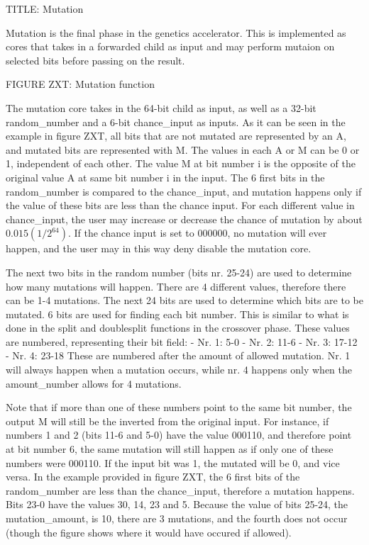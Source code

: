 TITLE: Mutation

Mutation is the final phase in the genetics accelerator. This is implemented as cores that takes in a forwarded child as input and may perform mutaion on selected bits before passing on the result. 

FIGURE ZXT: Mutation function

The mutation core takes in the 64-bit child as input, as well as a 32-bit random\_number and a 6-bit chance\_input as inputs. As it can be seen in the example in figure ZXT, all bits that are not mutated are represented by an A, and mutated bits are represented with M. The values in each A or M can be 0 or 1, independent of each other. The value M at bit number i is the opposite of the original value A at same bit number i in the input.
The 6 first bits in the random\_number is compared to the chance\_input, and mutation happens only if the value of these bits are less than the chance input. For each different value in chance\_input, the user may increase or decrease the chance of mutation by about $0.015 (1 / 2^64)$. If the chance input is set to 000000, no mutation will ever happen, and the user may in this way deny disable the mutation core.

The next two bits in the random number (bits nr. 25-24) are used to determine how many mutations will happen. There are 4 different values, therefore there can be 1-4 mutations.
The next 24 bits are used to determine which bits are to be mutated. 6 bits are used for finding each bit number. This is similar to what is done in the split and doublesplit functions in the crossover phase. These values are numbered, representing their bit field:
- Nr. 1: 5-0
- Nr. 2: 11-6
- Nr. 3: 17-12
- Nr. 4: 23-18
These are numbered after the amount of allowed mutation. Nr. 1 will always happen when a mutation occurs, while nr. 4 happens only when the amount\_number allows for 4 mutations.

Note that if more than one of these numbers point to the same bit number, the output M will still be the inverted from the original input. For instance, if numbers 1 and 2 (bits 11-6 and 5-0) have the value 000110, and therefore point at bit number 6, the same mutation will still happen as if only one of these numbers were 000110. If the input bit was 1, the mutated will be 0, and vice versa.
In the example provided in figure ZXT, the 6 first bits of the random\_number are less than the chance\_input, therefore a mutation happens. Bits 23-0 have the values 30, 14, 23 and 5. Because the value of bits 25-24, the mutation\_amount, is 10, there are 3 mutations, and the fourth does not occur (though the figure shows where it would have occured if allowed).